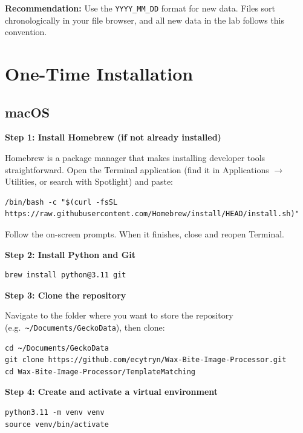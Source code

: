 \documentclass[11pt, letterpaper]{article}
\begin{document}
\begin{tipbox}
\textbf{Recommendation:} Use the \texttt{YYYY\_MM\_DD} format for new data. Files
sort chronologically in your file browser, and all new data in the lab follows this
convention.
\end{tipbox}

\section{One-Time Installation}
\label{sec:installation}

\subsection*{macOS}

\textbf{Step 1: Install Homebrew (if not already installed)}

Homebrew is a package manager that makes installing developer tools straightforward.
Open the Terminal application (find it in Applications $\to$ Utilities, or search with
Spotlight) and paste:

\begin{lstlisting}
/bin/bash -c "$(curl -fsSL https://raw.githubusercontent.com/Homebrew/install/HEAD/install.sh)"
\end{lstlisting}

Follow the on-screen prompts. When it finishes, close and reopen Terminal.

\textbf{Step 2: Install Python and Git}

\begin{lstlisting}
brew install python@3.11 git
\end{lstlisting}

\textbf{Step 3: Clone the repository}

Navigate to the folder where you want to store the repository (e.g.\ \texttt{\textasciitilde/Documents/GeckoData}),
then clone:

\begin{lstlisting}
cd ~/Documents/GeckoData
git clone https://github.com/ecytryn/Wax-Bite-Image-Processor.git
cd Wax-Bite-Image-Processor/TemplateMatching
\end{lstlisting}

\textbf{Step 4: Create and activate a virtual environment}

\begin{lstlisting}
python3.11 -m venv venv
source venv/bin/activate
\end{lstlisting}
\end{document}
